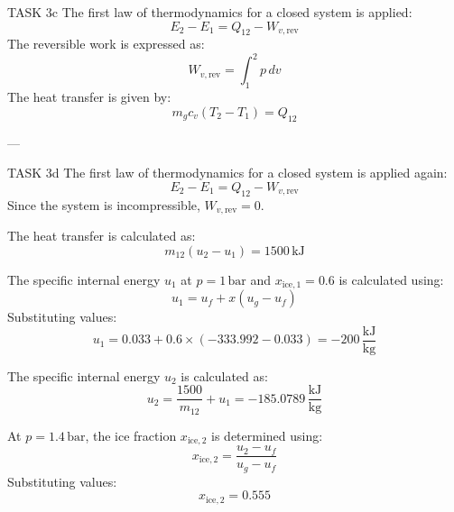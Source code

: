 TASK 3c  
The first law of thermodynamics for a closed system is applied:  
\[
E_2 - E_1 = Q_{12} - W_{v,\text{rev}}
\]  
The reversible work is expressed as:  
\[
W_{v,\text{rev}} = \int_{1}^{2} p \, dv
\]  
The heat transfer is given by:  
\[
m_g c_v (T_2 - T_1) = Q_{12}
\]  

---

TASK 3d  
The first law of thermodynamics for a closed system is applied again:  
\[
E_2 - E_1 = Q_{12} - W_{v,\text{rev}}
\]  
Since the system is incompressible, \( W_{v,\text{rev}} = 0 \).  

The heat transfer is calculated as:  
\[
m_{12} (u_2 - u_1) = 1500 \, \text{kJ}
\]  

The specific internal energy \( u_1 \) at \( p = 1 \, \text{bar} \) and \( x_{\text{ice},1} = 0.6 \) is calculated using:  
\[
u_1 = u_f + x (u_g - u_f)
\]  
Substituting values:  
\[
u_1 = 0.033 + 0.6 \times (-333.992 - 0.033) = -200 \, \frac{\text{kJ}}{\text{kg}}
\]  

The specific internal energy \( u_2 \) is calculated as:  
\[
u_2 = \frac{1500}{m_{12}} + u_1 = -185.0789 \, \frac{\text{kJ}}{\text{kg}}
\]  

At \( p = 1.4 \, \text{bar} \), the ice fraction \( x_{\text{ice},2} \) is determined using:  
\[
x_{\text{ice},2} = \frac{u_2 - u_f}{u_g - u_f}
\]  
Substituting values:  
\[
x_{\text{ice},2} = 0.555
\]